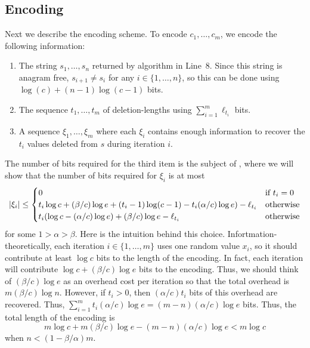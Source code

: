 \documentclass{patmorin}
\begin{document}

\subsection{Encoding}

Next we describe the encoding scheme.  To encode $c_1,\ldots,c_m$, we encode the following information:
\begin{enumerate}
  \item The string $s_1,\ldots,s_n$ returned by algorithm in Line~8. Since this string is anagram free, $s_{i+1}\neq s_{i}$ for any $i\in\{1,\ldots,n\}$, so this can be done using $\log(c) + (n-1)\log(c-1)$ bits.
  \item The sequence $t_1,\ldots,t_m$ of deletion-lengths using $\sum_{i=1}^m \ell_{t_i}$ bits.
  \item A sequence $\xi_1,\ldots,\xi_m$ where each $\xi_i$ contains enough information to recover the $t_i$ values deleted from $s$ during iteration $i$.
\end{enumerate}

The number of bits required for the third item is the subject of , where we will show that the number of bits required for $\xi_i$ is at most
\begin{equation}
   |\xi_i| 
   \le \begin{cases}
     0 & \text{if $t_i = 0$} \\
     t_i\log c +(\beta/c)\log e + (t_i-1)\log(c-1) - t_i(\alpha/c)\log e) - \ell_{t_i} 
        & \text{otherwise} \\
     t_i(\log c - (\alpha/c)\log e) +(\beta/c)\log e - \ell_{t_i} 
        & \text{otherwise}
   \end{cases}  \eqlabel{xi-i}
\end{equation}
for some $1 > \alpha > \beta$.
Here is the intuition behind this choice.  Infortmation-theoretically, each iteration $i\in\{1,\ldots,m\}$ uses one random value $x_i$, so it should contribute at least $\log c$ bits to the length of the encoding.  In fact, each iteration will contribute $\log c + (\beta/c)\log e$ bits to the encoding.  Thus, we should think of $(\beta/c)\log e$ as an overhead cost per iteration so that the total overhead is $m(\beta/c)\log n$.  However, if $t_i>0$, then $(\alpha/c)t_i$ bits of this overhead are recovered.  Thus, $\sum_{i=1}^m t_i(\alpha/c)\log e = (m-n)(\alpha/c)\log e$ bits.  Thus, the total length of the encoding is
\[
    m\log c + m(\beta/c)\log e - (m-n)(\alpha/c)\log e < m\log c
\]
when $n<(1-\beta/\alpha)m$.
\end{document}
